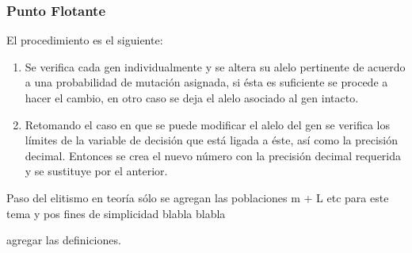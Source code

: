 \documentclass[class=report, crop=false]{standalone}
\begin{document}
\subsubsection{Punto Flotante}
El procedimiento es el siguiente:

\begin{enumerate}
\item Se verifica cada gen individualmente y se altera su 
alelo pertinente de acuerdo a una probabilidad de mutación 
asignada, si ésta es suficiente se procede a hacer el cambio, 
en otro caso se deja el alelo asociado al gen intacto.
\item Retomando el caso en que se puede modificar el alelo 
del gen se verifica los límites de la variable de decisión 
que está ligada a éste, así como la precisión decimal. 
Entonces se crea el nuevo número con la precisión decimal 
requerida y se sustituye por el anterior.
\end{enumerate}


Paso del elitismo en teoría sólo se agregan las poblaciones m + L etc para este tema y pos fines de simplicidad
blabla blabla

agregar las definiciones.

\end{document}
